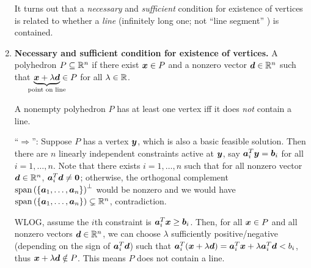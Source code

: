 \begin{enumerate}
It turns out that a \emph{necessary} and \emph{sufficient} condition for
existence of vertices is related to whether a \emph{line} (infinitely long one;
not ``line segment'' \warn{}) is contained.

\item \textbf{Necessary and sufficient condition for existence of vertices.}
A polyhedron \(P\subseteq \mathbb{R}^n\)  if there exist
\(\bm{x}\in P\) and a nonzero vector \(\bm{d}\in\mathbb{R}^n\) such that
\(\underbrace{\vect{x}+\lambda\vect{d}}_{\mathclap{\text{point on line}}}\in P\) for all \(\lambda\in\mathbb{R}\).

\begin{theorem}
\label{thm:vertex-exist-noline}
A nonempty polyhedron \(P\) has at least one vertex iff it does \emph{not}
contain a line.
\end{theorem}
\begin{pf}
``\(\Rightarrow\)'': Suppose \(P\) has a vertex \(\bm{y}\), which is also a
basic feasible solution. Then there are \(n\) linearly independent constraints
active at \(\bm{y}\), say \(\bm{a}_i^{T}\bm{y}=\bm{b}_i\) for all
\(i=1,\dotsc,n\). Note that there exists \(i=1,\dotsc,n\) such that for all
nonzero vector \(\bm{d}\in\mathbb{R}^n\), \(\bm{a}_i^{T}\bm{d}\ne\bm{0}\);
otherwise, the orthogonal complement
\(\operatorname{span}\left(\{\bm{a}_1,\dotsc,\bm{a}_n\}\right)^{\perp}\) would be nonzero and we
would have \(\operatorname{span}\left(\{\bm{a}_1,\dotsc,\bm{a}_n\}\right)\subsetneq \mathbb{R}^n\), contradiction.

WLOG, assume the \(i\)th constraint is \(\bm{a}_i^{T}\bm{x}\ge
\bm{b}_i\). Then, for all \(\bm{x}\in P\) and all nonzero vectors
\(\bm{d}\in\mathbb{R}^n\), we can choose \(\lambda\) sufficiently positive/negative
(depending on the sign of \(\bm{a}_i^{T}\bm{d}\)) such that
\(\bm{a}_i^{T}(\bm{x}+\lambda\bm{d})
=\bm{a}_i^{T}\bm{x}+\lambda\bm{a}_{i}^{T}\bm{d}<b_i\), thus
\(\bm{x}+\lambda\bm{d}\notin P\). This means \(P\) does not contain a line.


\end{pf}
\end{enumerate}
